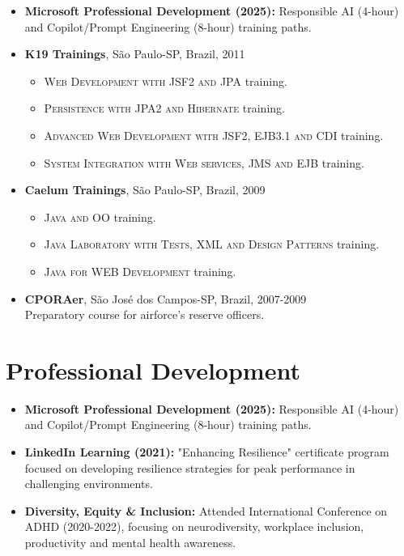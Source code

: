 \begin{itemize}
    \item \footnotesize{\textbf{Microsoft Professional Development (2025):}}\scriptsize{ Responsible AI (4-hour) and Copilot/Prompt Engineering (8-hour) training paths.}
    
    \item \footnotesize{\textbf{K19 Trainings}, São Paulo-SP, Brazil,}\scriptsize{ 2011}
    \begin{itemize}
        \item \scriptsize{\textsc{Web Development with JSF2 and JPA} training.}
        \item \scriptsize{\textsc{Persistence with JPA2 and Hibernate} training.}
        \item \scriptsize{\textsc{Advanced Web Development with JSF2, EJB3.1 and CDI} training.}
        \item \scriptsize{\textsc{System Integration with Web services, JMS and EJB} training.}
    \end{itemize}

    \item \footnotesize{\textbf{Caelum Trainings}, São Paulo-SP, Brazil,}\scriptsize{ 2009}
    \begin{itemize}
        \item \scriptsize{\textsc{Java and OO} training.}
        \item \scriptsize{\textsc{Java Laboratory with Tests, XML and Design Patterns} training.}
        \item \scriptsize{\textsc{Java for WEB Development} training.}
    \end{itemize}

    \item \footnotesize{\textbf{CPORAer}, São José dos Campos-SP, Brazil,}\scriptsize{ 2007-2009}\\
        \scriptsize{Preparatory course for airforce's reserve officers}.
\end{itemize}

\section{Professional Development}
\begin{itemize}
    \item \footnotesize{\textbf{Microsoft Professional Development (2025):}}\scriptsize{ Responsible AI (4-hour) and Copilot/Prompt Engineering (8-hour) training paths.}
    \item \footnotesize{\textbf{LinkedIn Learning (2021):}}\scriptsize{ "Enhancing Resilience" certificate program focused on developing resilience strategies for peak performance in challenging environments.}
    \item \footnotesize{\textbf{Diversity, Equity \& Inclusion:}}\scriptsize{ Attended International Conference on ADHD (2020-2022), focusing on neurodiversity, workplace inclusion, productivity and mental health awareness.}
\end{itemize}